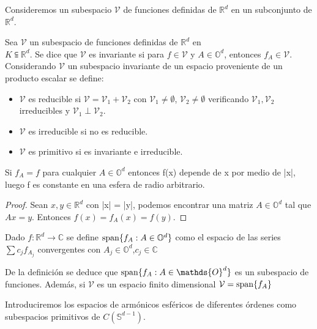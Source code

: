 Consideremos un subespacio $\mathcal{V}$ de funciones definidas de $\mathds{R}^d$ en un subconjunto de $\mathds{R}^d$.
\begin{defn}
	Sea $\mathcal{V}$ un subespacio de funciones definidas de $\mathds{R}^d$ en\\ $K \subseteqq \mathds{R}^d$. Se dice que $\mathcal{V}$ es invariante si para  $f \in \mathcal{V}$ y  $A\in\mathds{O}^d$, entonces  $f_A \in \mathcal{V}$.
	Considerando $\mathcal{V}$ un subespacio invariante de un espacio proveniente de un producto escalar se define:
	\begin{itemize}
		\item $\mathcal{V}$ es reducible si  $\mathcal{V} = \mathcal{V}_1 + \mathcal{V}_2$ con $\mathcal{V}_1 \not= \emptyset$, $\mathcal{V}_2 \not= \emptyset$ verificando $\mathcal{V}_1,\mathcal{V}_2$ irreducibles y $\mathcal{V}_1 \perp \mathcal{V}_2$.
		\item $\mathcal{V}$ es irreducible si no es reducible.
		\item $\mathcal{V}$ es primitivo si es invariante e irreducible.
	\end{itemize}
\end{defn}

\begin{prop}\label{prop:1}
Si $f_A=f$ para cualquier $A\in \mathds{O}^d$ entonces f(x) depende de x por medio de |x|, luego f es constante en una esfera de radio arbitrario.
\end{prop}

\begin{proof} Sean $x,y \in \mathds{R}^d$ con |x| = |y|, podemos encontrar una matriz $A \in \mathds{O}^d$ tal que $Ax = y$. Entonces $f(x)=f_A(x)=f(y)$.
	
\end{proof}

\begin{defn}Dado $f:\mathds{R}^d \to \mathds{C}$ se define $\operatorname{span}\{f_A : A \in \mathbb{O}^d\}$ como el espacio de las series $\sum c_jf_{A_j}$ convergentes con $A_j \in \mathds{O}^d$,$c_j \in \mathds{C}$ 
\end{defn}
De la definición se deduce que $\spn\{f_A : A \in \mathds{O}^d\}$ es un subespacio de funciones. Además, si $\mathcal{V}$ es un espacio finito dimensional $\mathcal{V} = \operatorname{span}\{f_A\}$
\medskip

Introduciremos los espacios de armónicos esféricos de diferentes órdenes como subespacios primitivos de $C(\mathds{S}^{d-1})$. 
